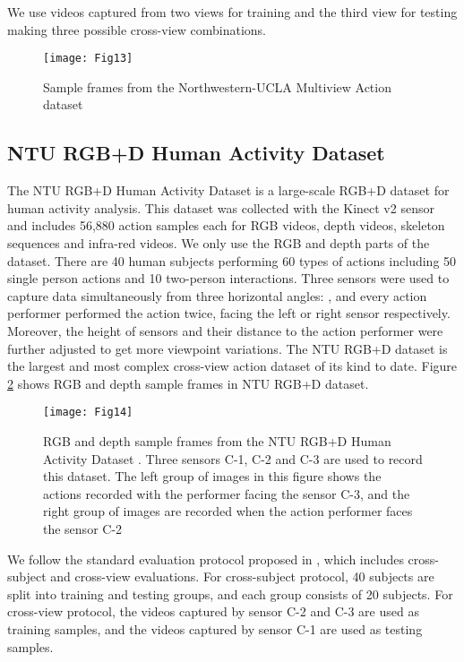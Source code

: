 \documentclass[twocolumn]{svjour3}          \smartqed  \usepackage{graphicx}
\begin{document}
We use videos captured from two views for training and the third view for testing making three possible cross-view combinations.

\begin{figure}[t]
\centering
\texttt{[image: Fig13]}
\caption{Sample frames from the Northwestern-UCLA Multiview Action dataset \citep{AOG}}
\label{fig:nucla_sample}
\end{figure}


\subsection{NTU RGB+D Human Activity Dataset}

The NTU RGB+D Human Activity Dataset \citep{shahroudy2016ntu} is a large-scale RGB+D dataset for human activity analysis. This dataset was collected with the Kinect v2 sensor and includes 56,880 action samples each for RGB videos, depth videos, skeleton sequences and infra-red videos. We only use the RGB and depth parts of the dataset. There are 40 human subjects performing 60 types of actions including 50 single person actions and 10 two-person interactions. Three sensors were used to capture data simultaneously from three horizontal angles: , and every action performer performed the action twice, facing the left or right sensor respectively. Moreover, the height of sensors and their distance to the action performer were further adjusted to get more viewpoint variations. The NTU RGB+D dataset is the largest and most complex cross-view action dataset of its kind to date. Figure \ref{fig:ntu_samples} shows RGB and depth sample frames in NTU RGB+D dataset.

\begin{figure}[t]
\centering
\texttt{[image: Fig14]}
\caption{RGB and depth sample frames from the NTU RGB+D Human Activity Dataset \citep{shahroudy2016ntu}. Three sensors C-1, C-2 and C-3 are used to record this dataset. The left group of images in this figure shows the actions recorded with the performer facing the sensor C-3, and the right group of images are recorded when the action performer faces the sensor C-2}
\label{fig:ntu_samples}
\end{figure}

We follow the standard evaluation protocol proposed in \citep{shahroudy2016ntu}, which includes cross-subject and cross-view evaluations. For cross-subject protocol, 40 subjects are split into training and testing groups, and each group consists of 20 subjects. For cross-view protocol, the videos captured by sensor C-2 and C-3 are used as training samples, and the videos captured by sensor C-1 are used as testing samples. 
\end{document}
